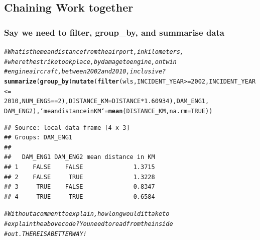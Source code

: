 \documentclass{beamer}\usepackage[]{graphicx}\usepackage[]{color}
\makeatletter
\newcommand{\hlnum}[1]{\textcolor[rgb]{0.686,0.059,0.569}{#1}}%
\newcommand{\hlcom}[1]{\textcolor[rgb]{0.678,0.584,0.686}{\textit{#1}}}%
\newcommand{\hlopt}[1]{\textcolor[rgb]{0,0,0}{#1}}%
\newcommand{\hlstd}[1]{\textcolor[rgb]{0.345,0.345,0.345}{#1}}%
\newcommand{\hlkwc}[1]{\textcolor[rgb]{0.333,0.667,0.333}{#1}}%
\newcommand{\hlkwd}[1]{\textcolor[rgb]{0.737,0.353,0.396}{\textbf{#1}}}%
\newenvironment{kframe}{%
 \def\at@end@of@kframe{}%
 \ifinner\ifhmode%
  \def\at@end@of@kframe{\end{minipage}}%
  \begin{minipage}{\columnwidth}%
 \fi\fi%
 \def\FrameCommand##1{\hskip\@totalleftmargin \hskip-\fboxsep
 \colorbox{shadecolor}{##1}\hskip-\fboxsep
     \hskip-\linewidth \hskip-\@totalleftmargin \hskip\columnwidth}%
 \MakeFramed {\advance\hsize-\width
   \@totalleftmargin\z@ \linewidth\hsize
   \@setminipage}}%
 {\par\unskip\endMakeFramed%
 \at@end@of@kframe}
\newenvironment{knitrout}{}{} %
\makeatother
\begin{document}
\subsection{Chaining Work together}%
\begin{frame}[fragile]
  \frametitle{Say we need to filter, group\_by, and
  summarise data}
\begin{knitrout}\footnotesize
{}\color{fgcolor}\begin{kframe}
\begin{alltt}
\hlcom{# What is the mean distance from the airport, in kilometers,}
\hlcom{# where the strike took place, by damage to engine, on twin}
\hlcom{# engine aircraft, between 2002 and 2010, inclusive?}
\hlkwd{summarize}\hlstd{(}\hlkwd{group_by}\hlstd{(}\hlkwd{mutate}\hlstd{(}\hlkwd{filter}\hlstd{(wls, INCIDENT_YEAR} \hlopt{>=} \hlnum{2002}\hlstd{, INCIDENT_YEAR} \hlopt{<=}
    \hlnum{2010}\hlstd{, NUM_ENGS} \hlopt{==} \hlnum{2}\hlstd{),} \hlkwc{DISTANCE_KM} \hlstd{= DISTANCE} \hlopt{*} \hlnum{1.60934}\hlstd{), DAM_ENG1,}
    \hlstd{DAM_ENG2),} \hlkwc{`mean distance in KM`} \hlstd{=} \hlkwd{mean}\hlstd{(DISTANCE_KM,} \hlkwc{na.rm} \hlstd{=} \hlnum{TRUE}\hlstd{))}
\end{alltt}
\begin{verbatim}
## Source: local data frame [4 x 3]
## Groups: DAM_ENG1
## 
##   DAM_ENG1 DAM_ENG2 mean distance in KM
## 1    FALSE    FALSE              1.3715
## 2    FALSE     TRUE              1.3228
## 3     TRUE    FALSE              0.8347
## 4     TRUE     TRUE              0.6584
\end{verbatim}
\begin{alltt}
\hlcom{# Without a comment to explain, how long would it take to}
\hlcom{# explain the above code?  You need to read from the inside}
\hlcom{# out.  THERE IS A BETTER WAY!}
\end{alltt}
\end{kframe}
\end{knitrout}
\end{frame} 
\end{document}
